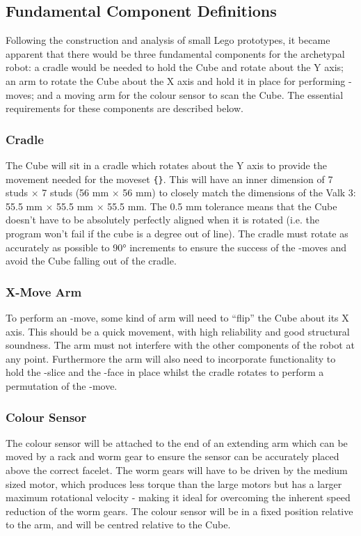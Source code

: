 \documentclass{report}
\newcommand{\movesetnospace}[1]{\uppercase{\texttt{\{\formatmovesnospace{#1}\}}}}
\newcommand{\face}[1]{\uppercase{\texttt{\formatmovesnospace{#1}}}-face}
\newcommand{\move}[1]{\uppercase{\texttt{\formatmovesnospace{#1}}}-move}
\newcommand{\slice}[1]{\uppercase{\texttt{\formatmovesnospace{#1}}}-slice}
\begin{document}
    \subsection{Fundamental Component Definitions} \label{sec:componentDefinitions}
    
    Following the construction and analysis of small Lego prototypes, it became apparent that there would be three fundamental components for the archetypal robot: a cradle would be needed to hold the Cube and rotate about the Y axis; an arm to rotate the Cube about the X axis and hold it in place for performing \move{d}s; and a moving arm for the colour sensor to scan the Cube. The essential requirements for these components are described below.
    
    \subsubsection{Cradle}
    
    The Cube will sit in a cradle which rotates about the Y axis to provide the movement needed for the moveset \movesetnospace{Y.Y'y2D.D'd2}. This will have an inner dimension of 7 studs $\times$ 7 studs (56 \si{\milli\metre} $\times$ 56 \si{\milli\metre}) to closely match the dimensions of the Valk 3: 55.5 \si{\milli\metre} $\times$ 55.5 \si{\milli\metre} $\times$ 55.5 \si{\milli\metre}. The 0.5 \si{\milli\metre} tolerance means that the Cube doesn't have to be absolutely perfectly aligned when it is rotated (i.e. the program won't fail if the cube is a degree out of line). The cradle must rotate as accurately as possible to \ang{90} increments to ensure the success of the \move{x}s and avoid the Cube falling out of the cradle. 
    
    \subsubsection{X-Move Arm}
    To perform an \move{x}, some kind of arm will need to \enquote{flip} the Cube about its X axis. This should be a quick movement, with high reliability and good structural soundness. The arm must not interfere with the other components of the robot at any point. Furthermore the arm will also need to incorporate functionality to hold the \slice{l-r} and the \face{u} in place whilst the cradle rotates to perform a permutation of the \move{d}.
    
    \subsubsection{Colour Sensor}
    The colour sensor will be attached to the end of an extending arm which can be moved by a rack and worm gear to ensure the sensor can be accurately placed above the correct facelet. The worm gears will have to be driven by the medium sized motor, which produces less torque than the large motors but has a larger maximum rotational velocity - making it ideal for overcoming the inherent speed reduction of the worm gears. The colour sensor will be in a fixed position relative to the arm, and will be centred relative to the Cube.
    
\end{document}
